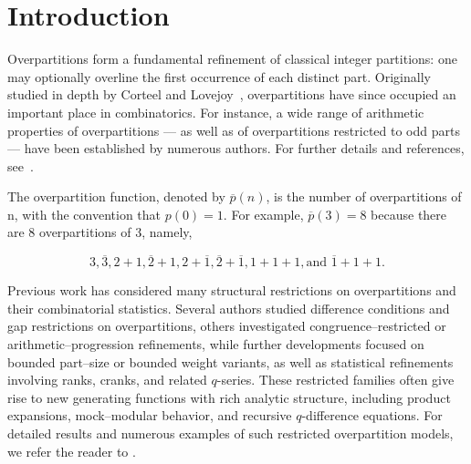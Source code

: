 \documentclass[letterpaper,12pt]{article}
\begin{document}
 






 

\section{Introduction}\label{sec:Introduction}

Overpartitions form a fundamental refinement of classical integer partitions:  
one may optionally overline the first occurrence of each distinct part.  
Originally studied in depth by Corteel and Lovejoy~\cite{corteel2004overpartitions}, 
overpartitions have since occupied an important place in   combinatorics.  For instance, a wide range of arithmetic properties of overpartitions --- as well as of overpartitions restricted to odd parts --- have been established by numerous authors. For further details and references, see~\cite{CHEN201562, chen2016ramanujan, chern2018some, hirschhorn2006arithmetic, kim2009short, nadji2025arithmetic, Ahmia202565}.



The overpartition function, denoted by $\overline{p}(n)$, is the number of overpartitions of
n, with the convention that $p(0) = 1$. For example, $\overline{p}(3) = 8$ because there are 8 overpartitions of 3, namely, 

\[
3,  \overline{3},  2 + 1,  \overline{2} + 1,  2 + \overline{1}, \overline{2} + \overline{1}, 1 + 1 + 1,  \text{and } \overline{1} + 1 + 1.
\]




Previous work has considered many structural restrictions on overpartitions and their
combinatorial statistics.  
Several authors studied difference conditions and gap restrictions on
overpartitions,  
others investigated congruence--restricted or arithmetic–progression
refinements,  
while further developments focused on bounded part–size or bounded weight
variants, 
as well as statistical refinements involving ranks, cranks, and related $q$-series.  
These restricted families often give rise to new generating functions with rich analytic
structure, including product expansions, mock–modular behavior, and recursive $q$-difference
equations.  
For detailed results and numerous examples of such restricted overpartition models, we refer
the reader to  
\cite{
Al-Saedi2019251,
Baruah2025,
Bringmann2015,
Chern2019,
Hanson2023,
Hirschhorn2020167,
Isnaini20191207,
Lin202059,
Naika20191,
Sills2010253,
Srivastava2020488,
Tang2023659}.
\end{document}
